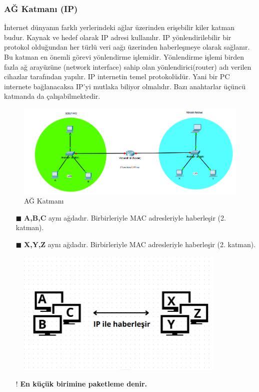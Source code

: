 \subsubsection{AĞ Katmanı (IP) }
İnternet dünyanın farklı yerlerindeki ağlar üzerinden erişebilir kiler katman budur.
Kaynak ve hedef olarak IP adresi kullanılır.
IP yönlendirilebilir bir protokol olduğundan her türlü veri aağı üzerinden haberleşmeye olarak sağlanır.
Bu katman en önemli görevi yönlendirme işlemidir.
Yönlendirme işlemi birden fazla ağ arayüzüne (network interface) sahip olan yönlendirici(router) adı verilen cihazlar tarafından yapılır.
IP internetin temel protokolüdür.
Yani bir PC internete bağlanacaksa IP'yi mutlaka biliyor olmalıdır.
	Bazı anahtarlar üçüncü katmanda da çalışabilmektedir.
\begin{figure}[!ht]
	\includegraphics[width=15cm]{images/ip_katman}
	\caption{AĞ Katmanı}
	\label{fig:exemple_for_network_model}
\end{figure}
\begin{enumerate}
	\item[$\blacksquare$] \textbf{A,B,C} aynı ağdadır. Birbirleriyle MAC  adresleriyle haberleşir (2. katman).
	\item[$\blacksquare$] \textbf{X,Y,Z} aynı ağdadır. Birbirleriyle MAC  adresleriyle haberleşir (2. katman).
\end{enumerate}
\begin{figure}[!ht]
	\centering
	\includegraphics[width=10cm]{images/ip_communication}
	\label{fig:exemple_for_ip_communication}
\end{figure}
\begin{enumerate}
	\item[!] \textbf{En küçük birimine paketleme denir.}
\end{enumerate}

